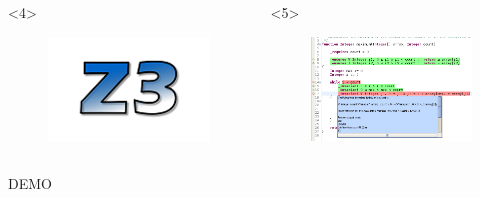 \documentclass[t,svgnames]{beamer}
\begin{document}
\begin{frame}
\begin{columns}[c]
		
		

\begin{onlyenv}<4>
		\begin{figure}
			\includegraphics[width=\textwidth]{z3.png}
		\end{figure}
		
	\end{onlyenv}
	
			\begin{onlyenv}<5>

		\begin{figure}
			\includegraphics[width=\textwidth]{screenshot2.png}
		\end{figure}
	\end{onlyenv}
	
		\end{columns}


\end{frame}


\begin{frame}
	\begin{center}
		\vfill
		\Huge{DEMO}
		\vfill		
	\end{center}
\end{frame}
\end{document}
